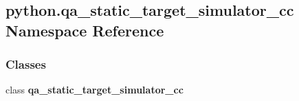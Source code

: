 \subsection{python.\+qa\+\_\+static\+\_\+target\+\_\+simulator\+\_\+cc Namespace Reference}
\label{namespacepython_1_1qa__static__target__simulator__cc}
\subsubsection*{Classes}
\begin{DoxyCompactItemize}
\item 
class {\bf qa\+\_\+static\+\_\+target\+\_\+simulator\+\_\+cc}
\end{DoxyCompactItemize}
